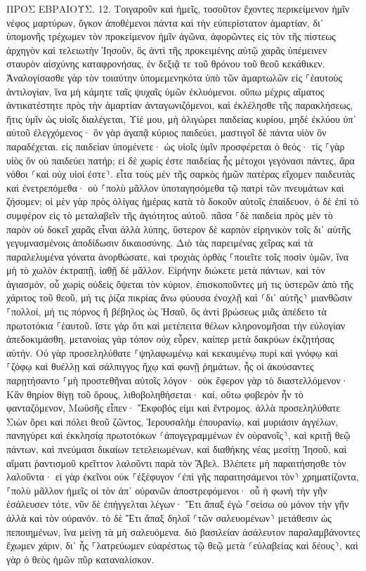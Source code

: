 \documentclass[twoside, 9pt]{extreport}
\begin{document}
ΠΡΟΣ ΕΒΡΑΙΟΥΣ.
12.
Τοιγαροῦν καὶ ἡμεῖς, τοσοῦτον ἔχοντες περικείμενον ἡμῖν νέφος μαρτύρων, ὄγκον ἀποθέμενοι πάντα καὶ τὴν εὐπερίστατον ἁμαρτίαν, δι᾽ ὑπομονῆς τρέχωμεν τὸν προκείμενον ἡμῖν ἀγῶνα, 
ἀφορῶντες εἰς τὸν τῆς πίστεως ἀρχηγὸν καὶ τελειωτὴν Ἰησοῦν, ὃς ἀντὶ τῆς προκειμένης αὐτῷ χαρᾶς ὑπέμεινεν σταυρὸν αἰσχύνης καταφρονήσας, ἐν δεξιᾷ τε τοῦ θρόνου τοῦ θεοῦ κεκάθικεν. 
Ἀναλογίσασθε γὰρ τὸν τοιαύτην ὑπομεμενηκότα ὑπὸ τῶν ἁμαρτωλῶν εἰς ⸀ἑαυτοὺς ἀντιλογίαν, ἵνα μὴ κάμητε ταῖς ψυχαῖς ὑμῶν ἐκλυόμενοι. 
οὔπω μέχρις αἵματος ἀντικατέστητε πρὸς τὴν ἁμαρτίαν ἀνταγωνιζόμενοι, 
καὶ ἐκλέλησθε τῆς παρακλήσεως, ἥτις ὑμῖν ὡς υἱοῖς διαλέγεται, Υἱέ μου, μὴ ὀλιγώρει παιδείας κυρίου, μηδὲ ἐκλύου ὑπ᾽ αὐτοῦ ἐλεγχόμενος· 
ὃν γὰρ ἀγαπᾷ κύριος παιδεύει, μαστιγοῖ δὲ πάντα υἱὸν ὃν παραδέχεται. 
εἰς παιδείαν ὑπομένετε· ὡς υἱοῖς ὑμῖν προσφέρεται ὁ θεός· τίς ⸀γὰρ υἱὸς ὃν οὐ παιδεύει πατήρ; 
εἰ δὲ χωρίς ἐστε παιδείας ἧς μέτοχοι γεγόνασι πάντες, ἄρα νόθοι ⸂καὶ οὐχ υἱοί ἐστε⸃. 
εἶτα τοὺς μὲν τῆς σαρκὸς ἡμῶν πατέρας εἴχομεν παιδευτὰς καὶ ἐνετρεπόμεθα· οὐ ⸀πολὺ μᾶλλον ὑποταγησόμεθα τῷ πατρὶ τῶν πνευμάτων καὶ ζήσομεν; 
οἱ μὲν γὰρ πρὸς ὀλίγας ἡμέρας κατὰ τὸ δοκοῦν αὐτοῖς ἐπαίδευον, ὁ δὲ ἐπὶ τὸ συμφέρον εἰς τὸ μεταλαβεῖν τῆς ἁγιότητος αὐτοῦ. 
πᾶσα ⸀δὲ παιδεία πρὸς μὲν τὸ παρὸν οὐ δοκεῖ χαρᾶς εἶναι ἀλλὰ λύπης, ὕστερον δὲ καρπὸν εἰρηνικὸν τοῖς δι᾽ αὐτῆς γεγυμνασμένοις ἀποδίδωσιν δικαιοσύνης. 
Διὸ τὰς παρειμένας χεῖρας καὶ τὰ παραλελυμένα γόνατα ἀνορθώσατε, 
καὶ τροχιὰς ὀρθὰς ⸀ποιεῖτε τοῖς ποσὶν ὑμῶν, ἵνα μὴ τὸ χωλὸν ἐκτραπῇ, ἰαθῇ δὲ μᾶλλον. 
Εἰρήνην διώκετε μετὰ πάντων, καὶ τὸν ἁγιασμόν, οὗ χωρὶς οὐδεὶς ὄψεται τὸν κύριον, 
ἐπισκοποῦντες μή τις ὑστερῶν ἀπὸ τῆς χάριτος τοῦ θεοῦ, μή τις ῥίζα πικρίας ἄνω φύουσα ἐνοχλῇ καὶ ⸂δι᾽ αὐτῆς⸃ μιανθῶσιν ⸀πολλοί, 
μή τις πόρνος ἢ βέβηλος ὡς Ἠσαῦ, ὃς ἀντὶ βρώσεως μιᾶς ἀπέδετο τὰ πρωτοτόκια ⸀ἑαυτοῦ. 
ἴστε γὰρ ὅτι καὶ μετέπειτα θέλων κληρονομῆσαι τὴν εὐλογίαν ἀπεδοκιμάσθη, μετανοίας γὰρ τόπον οὐχ εὗρεν, καίπερ μετὰ δακρύων ἐκζητήσας αὐτήν. 
Οὐ γὰρ προσεληλύθατε ⸀ψηλαφωμένῳ καὶ κεκαυμένῳ πυρὶ καὶ γνόφῳ καὶ ⸀ζόφῳ καὶ θυέλλῃ 
καὶ σάλπιγγος ἤχῳ καὶ φωνῇ ῥημάτων, ἧς οἱ ἀκούσαντες παρῃτήσαντο ⸀μὴ προστεθῆναι αὐτοῖς λόγον· 
οὐκ ἔφερον γὰρ τὸ διαστελλόμενον· Κἂν θηρίον θίγῃ τοῦ ὄρους, λιθοβοληθήσεται· 
καί, οὕτω φοβερὸν ἦν τὸ φανταζόμενον, Μωϋσῆς εἶπεν· Ἔκφοβός εἰμι καὶ ἔντρομος. 
ἀλλὰ προσεληλύθατε Σιὼν ὄρει καὶ πόλει θεοῦ ζῶντος, Ἰερουσαλὴμ ἐπουρανίῳ, καὶ μυριάσιν ἀγγέλων, πανηγύρει 
καὶ ἐκκλησίᾳ πρωτοτόκων ⸂ἀπογεγραμμένων ἐν οὐρανοῖς⸃, καὶ κριτῇ θεῷ πάντων, καὶ πνεύμασι δικαίων τετελειωμένων, 
καὶ διαθήκης νέας μεσίτῃ Ἰησοῦ, καὶ αἵματι ῥαντισμοῦ κρεῖττον λαλοῦντι παρὰ τὸν Ἅβελ. 
Βλέπετε μὴ παραιτήσησθε τὸν λαλοῦντα· εἰ γὰρ ἐκεῖνοι οὐκ ⸀ἐξέφυγον ⸂ἐπὶ γῆς παραιτησάμενοι τὸν⸃ χρηματίζοντα, ⸀πολὺ μᾶλλον ἡμεῖς οἱ τὸν ἀπ᾽ οὐρανῶν ἀποστρεφόμενοι· 
οὗ ἡ φωνὴ τὴν γῆν ἐσάλευσεν τότε, νῦν δὲ ἐπήγγελται λέγων· Ἔτι ἅπαξ ἐγὼ ⸀σείσω οὐ μόνον τὴν γῆν ἀλλὰ καὶ τὸν οὐρανόν. 
τὸ δὲ Ἔτι ἅπαξ δηλοῖ ⸂τῶν σαλευομένων⸃ μετάθεσιν ὡς πεποιημένων, ἵνα μείνῃ τὰ μὴ σαλευόμενα. 
διὸ βασιλείαν ἀσάλευτον παραλαμβάνοντες ἔχωμεν χάριν, δι᾽ ἧς ⸀λατρεύωμεν εὐαρέστως τῷ θεῷ μετὰ ⸂εὐλαβείας καὶ δέους⸃, 
καὶ γὰρ ὁ θεὸς ἡμῶν πῦρ καταναλίσκον. 
\end{document}
